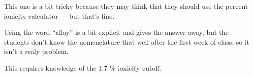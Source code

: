 \begin{comments}

This one is a bit tricky because they may think that they should use the percent ionicity calculator --- but that's fine.

Using the word ``alloy'' is a bit explicit and gives the answer away, but the students don't know the nomenclature that well after the first week of class, so it isn't a realy problem.

This requires knowledge of the 1.7 \% ionicity cutoff.

	
\end{comments}
